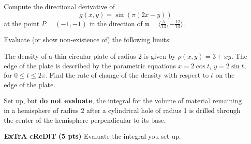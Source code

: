\documentclass[12pt, addpoints]{exam/exam}
\newcommand{\vect}[1]{\mathbf{#1}}
\theoremstyle{plain}
\begin{document}
\begin{questions}
\question[6] %
Compute the directional derivative of 
\[
g(x,y)=\sin{(\pi(2x-y))}
\]
at the point $P=(-1,-1)$ in the direction of 
$\vect u=\langle \frac{5}{13},-\frac{12}{13}\rangle$.  
\vspace{22pc}

\newpage
\question Evaluate (or show non-existence of) the following limits:

\question[6] %
The density of a thin circular plate of radius 2 is given by 
$\rho(x,y)=3+xy$.
The edge of the plate is described by the parametric equations 
$x=2\cos t$, $y=2\sin t$, 
for $0\leq t\leq 2\pi$.	Find the rate of change of the density with respect to $t$ on the edge of the plate.



\newpage
\question[10] %
Set up, but \textbf{do not evaluate}, the integral for the volume of material remaining in a hemisphere of 
radius 2 
after a cylindrical hole of 
radius 1 
is drilled through the center of the hemisphere perpendicular to its base.
\vspace{1pc}

\textbf{ExTrA cReDiT (5 pts)} Evaluate the integral you set up.
 
\end{questions}
\end{document}
